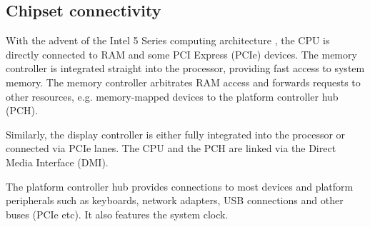 \subsection{Chipset connectivity}
With the advent of the Intel 5 Series computing architecture
\cite{wiki:intel:5:series}, the CPU is directly connected to RAM and
some PCI Express (PCIe) devices. The memory controller is
integrated straight into the processor, providing fast access to system memory.
The memory controller arbitrates RAM access and forwards requests to other
resources, e.g.  memory-mapped devices to the platform controller hub (PCH).

Similarly, the display controller is either fully integrated into the processor
or connected via PCIe lanes. The CPU and the PCH are linked via the Direct
Media Interface (DMI).

The platform controller hub provides connections to most devices and
platform peripherals such as keyboards, network adapters, USB connections and
other buses (PCIe etc). It also features the system clock.
